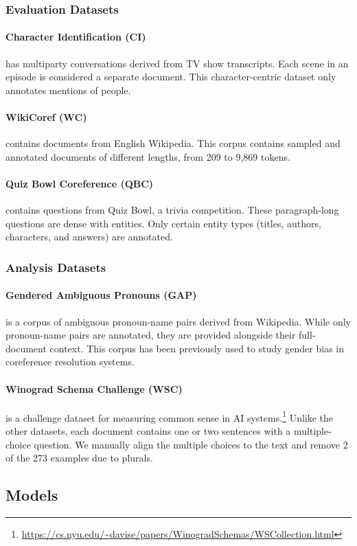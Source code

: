 \documentclass[12pt]{thesis-umich}[thesis]
\begin{document}
\subsubsection{Evaluation Datasets}
\label{sec:data:eval}



\paragraph{Character Identification (CI)} \cite{zhou-choi-2018-exist} has multiparty conversations derived from TV show transcripts. Each scene in an episode is considered a separate document. 
This character-centric dataset only annotates mentions of people. 

\paragraph{WikiCoref (WC)} \cite{ghaddar-langlais-2016-wikicoref} contains documents from English Wikipedia. This corpus contains sampled and annotated documents of different lengths, from 209 to 9,869 tokens. 

\paragraph{Quiz Bowl Coreference (QBC)} \cite{guha-etal-2015-removing} contains questions from Quiz Bowl, a trivia competition. These paragraph-long questions are dense with entities. Only certain entity types (titles, authors, characters, and answers) are annotated. 



\subsubsection{Analysis Datasets}
\label{sec:data:an}


\paragraph{Gendered Ambiguous Pronouns (GAP)} \cite{webster2018gap} is a corpus of ambiguous pronoun-name pairs derived from Wikipedia. While only pronoun-name pairs are annotated, they are provided alongside their full-document context. This corpus has been previously used to study gender bias in coreference resolution systems. 

\paragraph{Winograd Schema Challenge (WSC)} \cite{levasque2012wino} is a challenge dataset for measuring common sense in AI systems.\footnote{\url{https://cs.nyu.edu/~davise/papers/WinogradSchemas/WSCollection.html}} 
Unlike the other datasets, each document contains one or two sentences with a multiple-choice question.
We manually align the multiple choices to the text and remove 2 of the 273 examples due to plurals. \subsection{Models}
\end{document}
